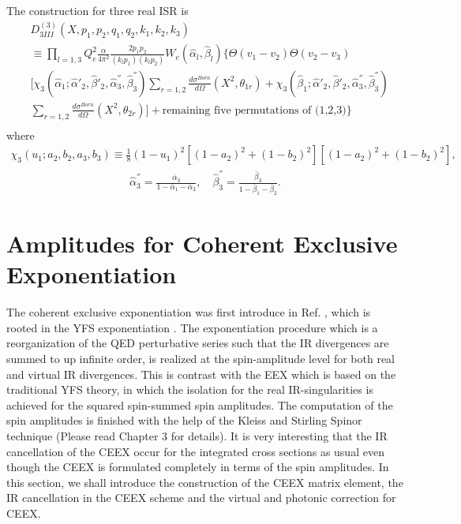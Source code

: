 The construction for three real ISR is
\begin{align}
&D^{(3)}_{3III}(X,p_1,p_2,q_1,q_2,k_1,k_2,k_3)\nonumber\\
&\equiv\prod_{l=1,3}Q^2_e\frac{\alpha}{4\pi^2}\frac{2p_1p_2}{(k_lp_1)(k_lp_2)}W_e(\hat{\alpha}_l,\hat{\beta}_l)\biggl\{ \Theta(v_1-v_2)\Theta(v_2-v_3) \nonumber\\
&\biggl[ \chi_3(\hat{\alpha}_1;\hat{\alpha}'_2,\hat{\beta}'_2,\hat{\alpha}_3^{''},\hat{\beta}^{''}_3)\sum_{r=1,2}\frac{d\sigma^{Born}}{d\Omega}(X^2,\theta_{1r}) +\chi_3(\hat{\beta}_1;\hat{\alpha}'_2,\hat{\beta}'_2,\hat{\alpha}_3^{''},\hat{\beta}^{''}_3)\nonumber\\
&\sum_{r=1,2}\frac{d\sigma^{Born}}{d\Omega}(X^2,\theta_{2r})\biggr]  + \text{remaining five permutations of (1,2,3)}   \biggr\}\nonumber\\
\end{align}
where
\begin{eqnarray*}
\chi_3(u_1;a_2,b_2,a_3,b_3)\equiv\frac{1}{8}(1-u_1)^2[(1-a_2)^2+(1-b_2)^2][(1-a_2)^2+(1-b_2)^2],
\end{eqnarray*}
\begin{eqnarray}
\hat{\alpha}^{''}_3=\frac{\bar{\alpha}_3}{1-\bar{\alpha}_1-\bar{\alpha}_2},\quad \hat{\beta}^{''}_3=\frac{\bar{\beta}_3}{1-\bar{\beta}_1-\bar{\beta}_2}.
\end{eqnarray}
\newpage
\section{Amplitudes for Coherent Exclusive Exponentiation}
The coherent exclusive exponentiation was first introduce in Ref. \cite{JBZ94}, which is rooted in the YFS exponentiation \cite{YFS}. The exponentiation procedure which is a reorganization of the QED perturbative series such that the IR divergences are summed to up infinite order, is realized at the spin-amplitude level for both real and virtual IR divergences.  This is contrast with the EEX which is based on the traditional YFS theory, in which the isolation for the real IR-singularities is achieved for the squared spin-summed spin amplitudes. The computation of the spin amplitudes is finished with the help of the Kleiss and Stirling Spinor technique \cite{KS} (Please read Chapter 3 for details). It is very interesting that the IR cancellation of the CEEX occur for the integrated cross sections as usual even though the CEEX is formulated completely in terms of the spin amplitudes. In this section, we shall introduce the construction of the CEEX matrix element, the IR cancellation in the CEEX scheme and the virtual and photonic correction for CEEX.                    
